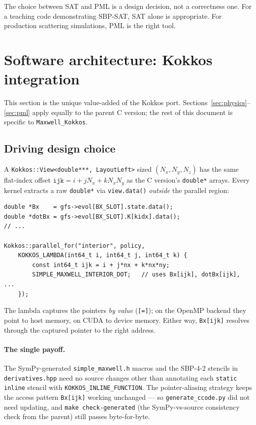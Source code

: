 \documentclass[11pt]{article}
\begin{document}
The choice between SAT and PML is a design decision, not a
correctness one.  For a teaching code demonstrating SBP-SAT, SAT
alone is appropriate.  For production scattering simulations, PML
is the right tool.

\section{Software architecture: Kokkos integration}
\label{sec:kokkos-arch}

This section is the unique value-added of the Kokkos port.
Sections~\ref{sec:physics}--\ref{sec:pml} apply equally to the
parent C version; the rest of this document is specific to
\texttt{Maxwell\_Kokkos}.

\subsection{Driving design choice}

A \texttt{Kokkos::View<double***, LayoutLeft>} sized
$(N_x, N_y, N_z)$ has the same flat-index offset
$\mathtt{ijk} = i + j N_x + k N_x N_y$ as the C version's
\texttt{double*} arrays.  Every kernel extracts a raw
\texttt{double*} via \texttt{view.data()} \emph{outside} the
parallel region:

\begin{lstlisting}[style=cpp]
double *Bx    = gfs->evol[BX_SLOT].state.data();
double *dotBx = gfs->evol[BX_SLOT].K[kidx].data();
// ...

Kokkos::parallel_for("interior", policy,
    KOKKOS_LAMBDA(int64_t i, int64_t j, int64_t k) {
        const int64_t ijk = i + j*nx + k*nx*ny;
        SIMPLE_MAXWELL_INTERIOR_DOT;   // uses Bx[ijk], dotBx[ijk], ...
    });
\end{lstlisting}

The lambda captures the pointers \emph{by value} (\texttt{[=]}); on
the OpenMP backend they point to host memory, on CUDA to device
memory.  Either way, \texttt{Bx[ijk]} resolves through the captured
pointer to the right address.

\paragraph{The single payoff.}
The SymPy-generated \texttt{simple\_maxwell.h} macros and the
SBP-4-2 stencils in \texttt{derivatives.hpp} need no source changes
other than annotating each \texttt{static inline} stencil with
\texttt{KOKKOS\_INLINE\_FUNCTION}.  The pointer-aliasing strategy
keeps the access pattern \texttt{Bx[ijk]} working unchanged --- so
\texttt{generate\_ccode.py} did not need updating, and
\texttt{make check-generated} (the SymPy-vs-source consistency
check from the parent) still passes byte-for-byte.
\end{document}
